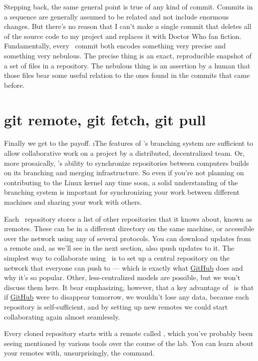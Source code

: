 \documentclass[letterpaper, 12pt, titlepage, twoside]{article}
\begin{document}
Stepping back, the same general point is true of any kind of commit. Commits
in a sequence are generally assumed to be related and not include enormous
changes. But there's no reason that I can't make a single commit that deletes
all of the source code to my project and replaces it with Doctor Who fan
fiction. Fundamentally, every \git\ commit both encodes something very precise
and something very nebulous. The precise thing is an exact, reproducible
snapshot of a set of files in a repository. The nebulous thing is an assertion
by a human that those files bear some useful relation to the ones found in the
commits that came before.


\section{git remote, git fetch, git pull}

Finally we get to the payoff. \i{The features of \git's branching system are
  sufficient to allow collaborative work on a project by a distributed,
  decentralized team.} Or, more prosaically, \git's ability to synchronize
repositories between computers builds on its branching and merging
infrastructure. So even if you're not planning on contributing to the Linux
kernel any time soon, a solid understanding of the branching system is
important for synchronizing your work between different machines and sharing
your work with others.

Each \git\ repository stores a list of other repositories that it knows about,
known as \i{remotes}. These can be in a different directory on the same
machine, or accessible over the network using any of several protocols. You
can download updates from a remote and, as we'll see in the next section, also
\i{push} updates to it. The simplest way to collaborate using \git\ is to set
up a central repository on the network that everyone can push to --- which is
exactly what \href{https://github.com/}{GitHub} does and why it's so popular.
Other, less-centralized models are possible, but we won't discuss them here.
It bear emphasizing, however, that a key advantage of \git\ is that if
\href{https://github.com/}{GitHub} were to disappear tomorrow, we wouldn't
lose any data, because each repository is self-sufficient, and by setting up
new remotes we could start collaborating again almost seamlessly.

Every cloned repository starts with a remote called , which you've
probably been seeing mentioned by various tools over the course of the lab.
You can learn about your remotes with, unsurprisingly, the 
command.
\end{document}
